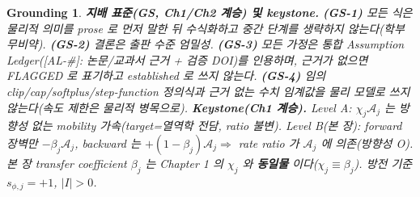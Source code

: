 \documentclass[11pt,a4paper]{article}
\newtheorem*{groundingbox}{Grounding}
\newcommand{\AL}[1]{\textsf{[AL-#1]}}
\begin{document}
\begin{groundingbox}
\textbf{지배 표준(GS, Ch1/Ch2 계승) 및 keystone.} \textbf{(GS-1)} 모든 식은 물리적 의미를 prose 로 먼저 말한 뒤
수식화하고 중간 단계를 생략하지 않는다(학부 무비약). \textbf{(GS-2)} 결론은 출판 수준 엄밀성. \textbf{(GS-3)} 모든
가정은 통합 Assumption Ledger(\AL{\#}: 논문/교과서 근거 + 검증 DOI)를 인용하며, 근거가 없으면 FLAGGED 로
표기하고 established 로 쓰지 않는다. \textbf{(GS-4)} 임의 clip/cap/softplus/step-function 정의식과 근거 없는
수치 임계값을 물리 모델로 쓰지 않는다(속도 제한은 물리적 병목으로). \textbf{Keystone(Ch1 계승).} Level A:
$\chi_j\mathcal A_j$ 는 \emph{방향성 없는} mobility 가속(target=열역학 전담, ratio 불변). Level B(본 장):
forward 장벽만 $-\beta_j\mathcal A_j$, backward 는 $+(1-\beta_j)\mathcal A_j\Rightarrow$ rate ratio 가
$\mathcal A_j$ 에 의존(방향성 O). 본 장 transfer coefficient $\beta_j$ 는 Chapter 1 의 $\chi_j$ 와 \textbf{동일물}
이다($\chi_j\equiv\beta_j$). 방전 기준 $s_{\phi,j}=+1$, $|I|>0$.
\end{groundingbox}

\tableofcontents
\newpage

\end{document}
